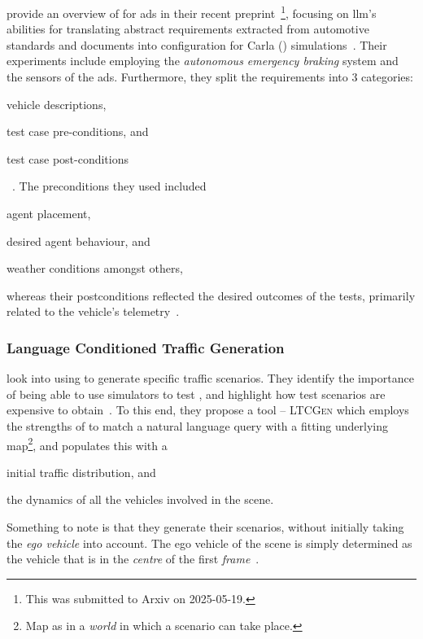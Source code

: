 \citeauthor{requirementsAllYouNeed} provide an overview of  for \acrshort{ads} in
their recent preprint~\footnote{This was submitted to Arxiv on
    2025-05-19.}, focusing on \acrshort{llm}'s abilities for translating abstract requirements extracted
from automotive standards and documents into configuration for Carla ()
simulations~\cite{requirementsAllYouNeed}. Their experiments include employing the
\textit{autonomous emergency braking} system and the sensors of the \acrshort{ads}. Furthermore, they
split the requirements into \num{3} categories: \begin{inparaenum}
    \item vehicle descriptions,
    \item test case pre-conditions, and
    \item test case post-conditions
\end{inparaenum}~\cite{requirementsAllYouNeed}. The preconditions they used included
\begin{inparaenum}
    \item agent placement,
    \item desired agent behaviour, and
    \item weather conditions amongst others,
\end{inparaenum} whereas their postconditions reflected
the desired outcomes of the tests, primarily related to the vehicle's
telemetry~\cite{requirementsAllYouNeed}.

\subsubsection{Language Conditioned Traffic Generation}

\citeauthor{languageconditionedtrafficgeneration} look into using  to generate
specific traffic scenarios. They identify the importance of being able to use simulators to test
, and highlight how test scenarios are expensive to
obtain~\cite[1]{languageconditionedtrafficgeneration}. To this end, they propose a tool --
\textsc{LTCGen} which employs the strengths of  to match a natural language query
with a fitting underlying map\footnote{Map as in a \textit{world} in which a scenario can take
    place.}, and populates this with a \begin{inparaenum}
    \item initial traffic distribution, and
    \item the dynamics of all the vehicles involved in the scene.
\end{inparaenum}
Something to note is that they generate their scenarios, without initially taking the \textit{ego
    vehicle} into account. The ego vehicle of the scene is simply determined as the vehicle that is
in the \textit{centre} of the first
\textit{frame}~\cite[3]{languageconditionedtrafficgeneration}.

